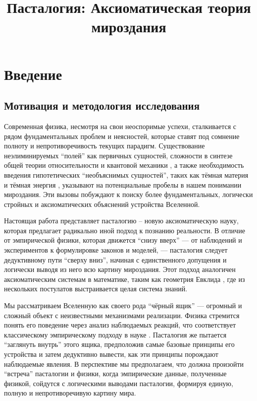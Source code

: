 \documentclass[pdflatex,sn-mathphys-num]{sn-jnl}
\title[Пасталогия]{Пасталогия: Аксиоматическая теория мироздания}
\author*[1]{\fnm{Владимир} \sur{Ситников}}\email{montenegrofsm@google.com}
\affil*[1]{\orgdiv{Независимый исследователь}, \city{Бар}, \country{Черногория}}
\begin{document}
\maketitle

\section{Введение}\label{sec:introduction}

\subsection{Мотивация и методология исследования}\label{subsec:motivation-methodology}

Современная физика, несмотря на свои неоспоримые успехи, сталкивается с рядом фундаментальных проблем и неясностей, которые ставят под сомнение полноту и непротиворечивость текущих парадигм. Существование неэлиминируемых ``полей'' как первичных сущностей, сложности в синтезе общей теории относительности \cite{einstein1916} и квантовой механики \cite{bohr1928}, а также необходимость введения гипотетических ``необъяснимых сущностей'', таких как тёмная материя \cite{rubin1980} и тёмная энергия \cite{riess1998}, указывают на потенциальные пробелы в нашем понимании мироздания. Эти вызовы побуждают к поиску более фундаментальных, логически стройных и аксиоматических объяснений устройства Вселенной.

Настоящая работа представляет пасталогию – новую аксиоматическую науку, которая предлагает радикально иной подход к познанию реальности. В отличие от эмпирической физики, которая движется ``снизу вверх'' --- от наблюдений и экспериментов к формулировке законов и моделей, --- пасталогия следует дедуктивному пути ``сверху вниз'', начиная с единственного допущения и логически выводя из него всю картину мироздания. Этот подход аналогичен аксиоматическим системам в математике, таким как геометрия Евклида \cite{euclid-elements-heath}, где из нескольких постулатов выстраивается целая система знаний.

Мы рассматриваем Вселенную как своего рода ``чёрный ящик'' \cite{wiener1948} --- огромный и сложный объект с неизвестными механизмами реализации. Физика стремится понять его поведение через анализ наблюдаемых реакций, что соответствует классическому эмпирическому подходу в науке \cite{popper1959}. Пасталогия же пытается ``заглянуть внутрь'' этого ящика, предположив самые базовые принципы его устройства и затем дедуктивно вывести, как эти принципы порождают наблюдаемые явления. В перспективе мы предполагаем, что должна произойти ``встреча'' пасталогии и физики, когда эмпирические данные, полученные физикой, сойдутся с логическими выводами пасталогии, формируя единую, полную и непротиворечивую картину мира.
\end{document}
